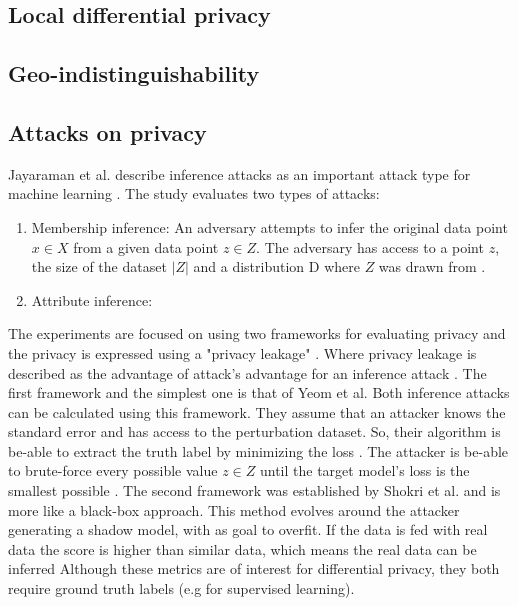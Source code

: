 \subsection{Local differential privacy}
\subsection{Geo-indistinguishability}
\subsection{Attacks on privacy}
Jayaraman et al. describe inference attacks as an important attack type for machine learning \citep{jayaraman_evaluating_nodate}.
The study evaluates two types of attacks:
\begin{enumerate}
  \item Membership inference: An adversary attempts to infer the original data point $x \in X$ from a given data point $z \in Z$.
        The adversary has access to a point $z$, the size of the dataset $|Z|$ and a distribution D where $Z$ was drawn from \citep{yeom_privacy_2018}.
  \item Attribute inference:
\end{enumerate}
The experiments are focused on using two frameworks for evaluating privacy and the privacy is expressed using a "privacy leakage" \citep{jayaraman_evaluating_nodate}.
Where privacy leakage is described as the advantage of attack's advantage for an inference attack \cite{yeom_privacy_2018}.
The first framework and the simplest one \citep{jayaraman_evaluating_nodate} is that of Yeom et al.
Both inference attacks can be calculated using this framework.
They assume that an attacker knows the standard error and has access to the perturbation dataset.
So, their algorithm is be-able to extract the truth label by minimizing the loss \citep{yeom_privacy_2018}.
The attacker is be-able to brute-force every possible value $z \in Z$ until the target model's loss is the smallest possible \cite{jayaraman_evaluating_nodate}.
The second framework was established by Shokri et al. and is more like a black-box approach.
This method evolves around the attacker generating a shadow model, with as goal to overfit.
If the data is fed with real data the score is higher than similar data, which means the real data can be inferred \citep{shokri_membership_2017,jayaraman_evaluating_nodate}
Although these metrics are of interest for differential privacy, they both require ground truth labels (e.g for supervised learning).
